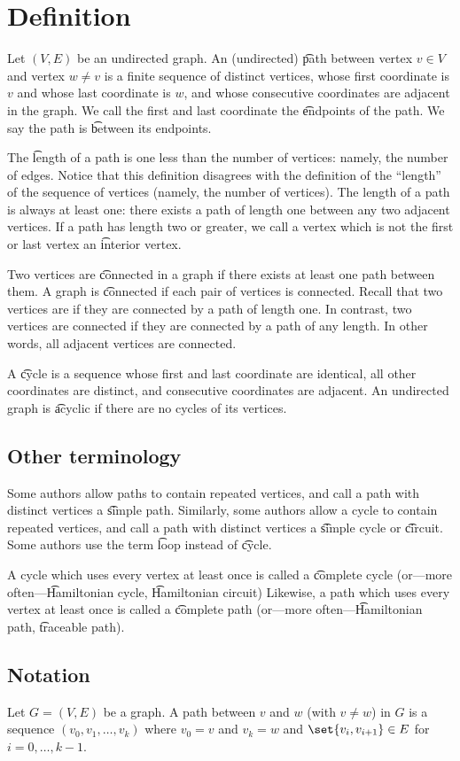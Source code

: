 
\section*{Definition}

Let $(V, E)$ be an undirected graph.
An (undirected) \t{path} between vertex $v \in V$ and vertex $w \neq v$ is a finite sequence of distinct vertices, whose first coordinate is $v$ and whose last coordinate is $w$, and whose consecutive coordinates are adjacent in the graph.
We call the first and last coordinate the \t{endpoints} of the path.
We say the path is \t{between} its endpoints.

The \t{length} of a path is one less than the number of vertices: namely, the number of edges.
Notice that this definition disagrees with the definition of the ``length'' of the sequence of vertices (namely, the number of vertices).
The length of a path is always at least one: there exists a path of length one between any two adjacent vertices.
If a path has length two or greater, we call a vertex which is not the first or last vertex an \t{interior vertex}.

Two vertices are \t{connected} in a graph if there exists at least one path between them.
A graph is \t{connected} if each pair of vertices is connected.
Recall that two vertices are if they are connected by a path of length one.
In contrast, two vertices are connected if they are connected by a path of any length.
In other words, all adjacent vertices are connected.

A \t{cycle} is a sequence whose first and last coordinate are identical, all other coordinates are distinct, and consecutive coordinates are adjacent.
An undirected graph is \t{acyclic} if there are no cycles of its vertices.

\subsection*{Other terminology}

Some authors allow paths to contain repeated vertices, and call a path with distinct vertices a \t{simple path}.
Similarly, some authors allow a cycle to contain repeated vertices, and call a path with distinct vertices a \t{simple cycle} or \t{circuit}.
Some authors use the term \t{loop} instead of \t{cycle}.

A cycle which uses every vertex at least once is called a \t{complete cycle} (or---more often---\t{Hamiltonian cycle}, \t{Hamiltonian circuit})
Likewise, a path which uses every vertex at least once is called a \t{complete path} (or---more often---\t{Hamiltonian path}, \t{traceable path}).

\subsection*{Notation}

Let $G = (V, E)$ be a graph.
A path between $v$ and $w$ (with $v \neq w$) in $G$ is a sequence $(v_0, v_1, \dots , v_k)$ where $v_0 = v$ and $v_k = w$ and $\set{v_i, v_{i+1}} \in E$ for $i = 0, \dots , k-1$.
